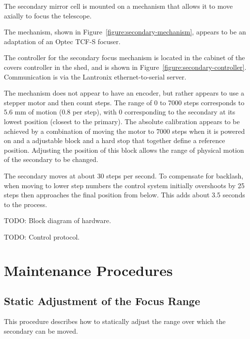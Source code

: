 The secondary mirror cell is mounted on a mechanism that allows it to move axially to focus the telescope.

The mechanism, shown in Figure~\ref{figure:secondary-mechanism}, appears to be an adaptation of an Optec TCF-S focuser. 

The controller for the secondary focus mechanism is located in the cabinet of the covers controller in the shed, and is shown in Figure~\ref{figure:secondary-controller}. Communication is via the Lantronix ethernet-to-serial server.

The mechanism does not appear to have an encoder, but rather appears to use a stepper motor and then count steps. The range of 0 to 7000 steps corresponds to 5.6 mm of motion (0.8 {\micron} per step), with 0 corresponding to the secondary at its lowest position (closest to the primary). The absolute calibration appears to be achieved by a combination of moving the motor to 7000 steps when it is powered on and a adjustable block and a hard stop that together define a reference position. Adjusting the position of this block allows the range of physical motion of the secondary to be changed.

The secondary moves at about 30 steps per second. To compensate for backlash, when moving to lower step numbers the control system initially overshoots by 25 steps then approaches the final position from below. This adds about 3.5 seconds to the process.

TODO: Block diagram of hardware.

TODO: Control protocol.

\section{Maintenance Procedures}

\subsection{Static Adjustment of the Focus Range}
\label{section:secondary:static-adjustmentl}

This procedure describes how to statically adjust the range over which the secondary can be moved.

